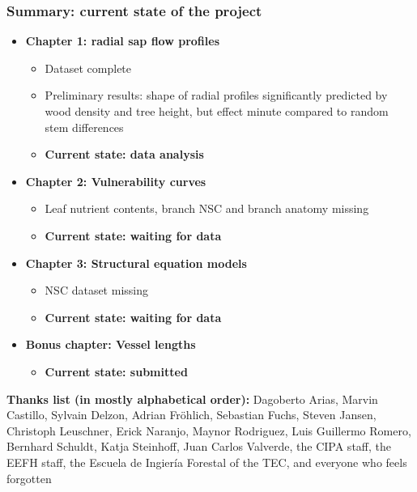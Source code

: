 \documentclass[usepdftitle=false]{beamer}
\newcommand{\Blue}[1]{{\color{blue!50!black}\textbf{#1}}}
\begin{document}
\begin{frame}
	\frametitle{Summary: current state of the project}	
	\begin{itemize}
		\item<1-> \Blue{Chapter 1: radial sap flow profiles}
		\begin{itemize}
			\item Dataset complete
			\item Preliminary results: shape of radial profiles significantly predicted by wood density and tree height, but effect minute compared to random stem differences 
			\item \textbf{Current state: \alert<1>{data analysis}}
		\end{itemize}
		\item<2-> \Blue{Chapter 2: Vulnerability curves}
		\begin{itemize}
			\item Leaf nutrient contents, branch NSC and branch anatomy missing
			\item \textbf{Current state: \alert<2>{waiting for data}}
		\end{itemize}
		\item<3-> \Blue{Chapter 3: Structural equation models}
		\begin{itemize}
			\item NSC dataset missing
			\item \textbf{Current state: \alert<3>{waiting for data}}
		\end{itemize}
		\item<4-> \Blue{Bonus chapter: Vessel lengths}
		\begin{itemize}
			\item \textbf{Current state: \alert<4>{submitted}}
		\end{itemize}
	\end{itemize}
\end{frame}

	\begin{frame}[plain]
		\begin{block}{\textbf{Thanks list (in mostly alphabetical order):}}
			Dagoberto Arias, Marvin Castillo, Sylvain Delzon, Adrian Fröhlich, Sebastian Fuchs, Steven Jansen, Christoph Leuschner, Erick Naranjo, Maynor Rodriguez, Luis Guillermo Romero, Bernhard Schuldt, Katja Steinhoff, Juan Carlos Valverde, the CIPA staff, the EEFH staff, the Escuela de Ingiería Forestal of the TEC, and everyone who feels forgotten
		\end{block}		
	\end{frame}
\end{document}
